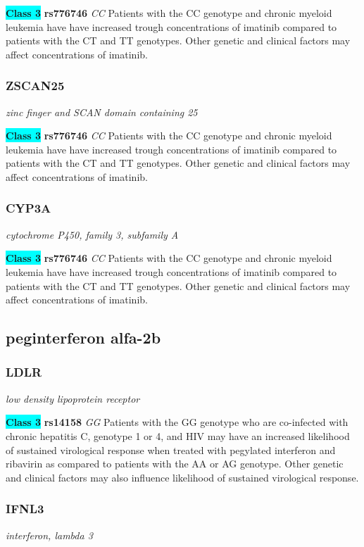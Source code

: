 \documentclass{report}
\begin{document}
\textbf{\colorbox{cyan} {Class 3}} \textbf{ rs776746 } \textit{ CC }
Patients with the CC genotype and chronic myeloid leukemia have have increased trough concentrations of imatinib compared to patients with the CT and TT genotypes. Other genetic and clinical factors may affect concentrations of imatinib.\newline\subsubsection{ ZSCAN25 }
\textit{ zinc finger and SCAN domain containing 25 }

\textbf{\colorbox{cyan} {Class 3}} \textbf{ rs776746 } \textit{ CC }
Patients with the CC genotype and chronic myeloid leukemia have have increased trough concentrations of imatinib compared to patients with the CT and TT genotypes. Other genetic and clinical factors may affect concentrations of imatinib.\newline\subsubsection{ CYP3A }
\textit{ cytochrome P450, family 3, subfamily A }

\textbf{\colorbox{cyan} {Class 3}} \textbf{ rs776746 } \textit{ CC }
Patients with the CC genotype and chronic myeloid leukemia have have increased trough concentrations of imatinib compared to patients with the CT and TT genotypes. Other genetic and clinical factors may affect concentrations of imatinib.\newline\subsection{ peginterferon alfa-2b }\subsubsection{ LDLR }
\textit{ low density lipoprotein receptor }

\textbf{\colorbox{cyan} {Class 3}} \textbf{ rs14158 } \textit{ GG }
Patients with the GG genotype who are co-infected with chronic hepatitis C, genotype 1 or 4, and HIV may have an increased likelihood of sustained virological response when treated with pegylated interferon and ribavirin as compared to patients with the AA or AG genotype. Other genetic and clinical factors may also influence likelihood of sustained virological response. \newline\subsubsection{ IFNL3 }
\textit{ interferon, lambda 3 }
\end{document}
